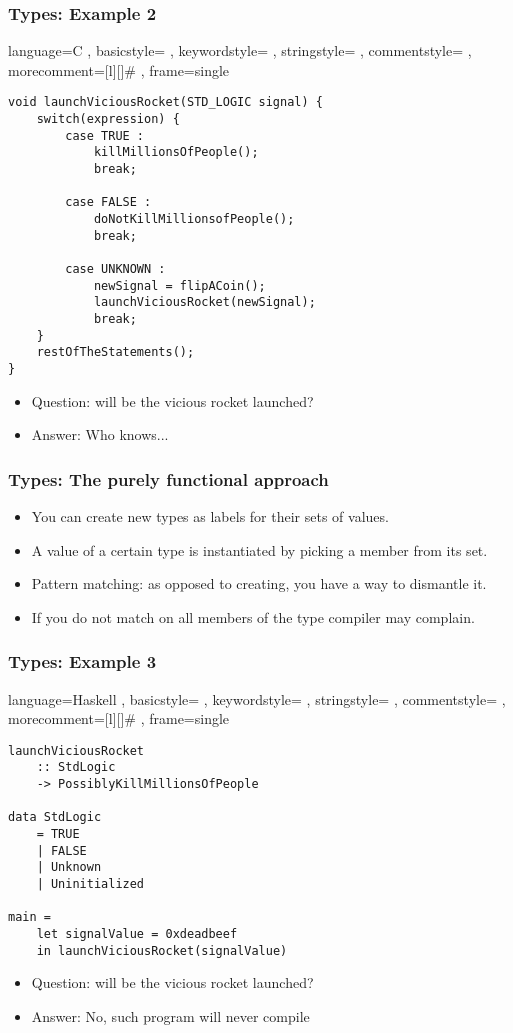 \documentclass[11pt]{beamer}
\begin{document}
\begin{frame}[fragile]
	\frametitle{Types: Example 2}
	
	\lstset
	{ language=C
		, basicstyle=\ttfamily\footnotesize
		, keywordstyle=\color{blue}\ttfamily
		, stringstyle=\color{red}\ttfamily
		, commentstyle=\color{green}\ttfamily
		, morecomment=[l][\color{magenta}]{\#}
		, frame=single
	}
	
\begin{lstlisting}
void launchViciousRocket(STD_LOGIC signal) {
    switch(expression) {
        case TRUE :
            killMillionsOfPeople();
            break;
	
        case FALSE :
            doNotKillMillionsofPeople();
            break;
	
        case UNKNOWN :
            newSignal = flipACoin();
    	    launchViciousRocket(newSignal);
    	    break;
    }
    restOfTheStatements();
}
\end{lstlisting}
	
\begin{itemize}[<+->]
	\item Question: will be the vicious rocket launched?
	\item Answer: Who knows...
\end{itemize}
\end{frame}

	\begin{frame}
		\frametitle{Types: The purely functional approach}
			\begin{itemize}[<+->]
				\item You can create new types as labels for their sets of values.
				\item A value of a certain type is instantiated by picking a member from its set.
				\item Pattern matching: as opposed to creating, you have a way to dismantle it.
				\item If you do not match on all members of the type compiler may complain.
			\end{itemize}
	\end{frame}

\begin{frame}[fragile]
\frametitle{Types: Example 3}
\lstset
{ language=Haskell
	, basicstyle=\ttfamily\footnotesize
	, keywordstyle=\color{blue}\ttfamily
	, stringstyle=\color{red}\ttfamily
	, commentstyle=\color{green}\ttfamily
	, morecomment=[l][\color{magenta}]{\#}
	, frame=single
}
\begin{lstlisting}
launchViciousRocket 
    :: StdLogic 
    -> PossiblyKillMillionsOfPeople

data StdLogic
    = TRUE
    | FALSE
    | Unknown
    | Uninitialized
	
main = 
    let signalValue = 0xdeadbeef 
    in launchViciousRocket(signalValue)		
\end{lstlisting}
\begin{itemize}[<+->]
	\item Question: will be the vicious rocket launched?
	\item Answer: No, such program will never compile
\end{itemize}		
\end{frame}
\end{document}
